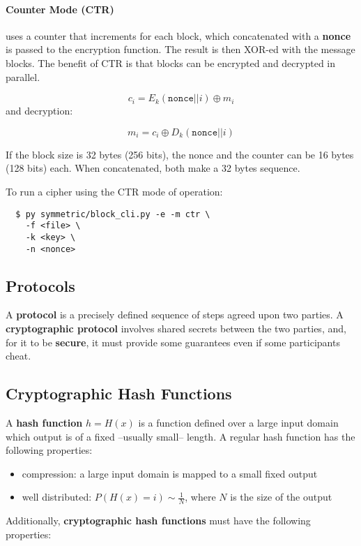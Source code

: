 \documentclass[12pt, letterpaper]{article}
\begin{document}
\paragraph{Counter Mode (CTR)} uses a counter that increments for each block, which concatenated with a \textbf{nonce} is passed to the encryption function.
The result is then XOR-ed with the message blocks.
The benefit of CTR is that blocks can be encrypted and decrypted in parallel.

\[
  c_i = E_k(\mathtt{nonce} || i) \oplus m_i
\]
and decryption:

\[
  m_i = c_i \oplus D_k(\mathtt{nonce} || i)
\]

If the block size is 32 bytes (256 bits), the nonce and the counter can be 16 bytes (128 bits) each.
When concatenated, both make a 32 bytes sequence.

To run a cipher using the CTR mode of operation:

\begin{verbatim}
  $ py symmetric/block_cli.py -e -m ctr \
    -f <file> \
    -k <key> \
    -n <nonce>
\end{verbatim}

\subsection{Protocols}

A \textbf{protocol} is a precisely defined sequence of steps agreed upon two parties.
A \textbf{cryptographic protocol} involves shared secrets between the two parties, and, for it to be \textbf{secure}, it must provide some guarantees even if some participants cheat.


\subsection{Cryptographic Hash Functions}

A \textbf{hash function} $h = H(x)$ is a function defined over a large input domain which output is of a fixed --usually small-- length.
A regular hash function has the following properties:

\begin{itemize}
  \item compression: a large input domain is mapped to a small fixed output
  \item well distributed: $P(H(x) = i) \sim \frac{1}{N}$, where $N$ is the size of the output
\end{itemize}
Additionally, \textbf{cryptographic hash functions} must have the following properties:
\end{document}

